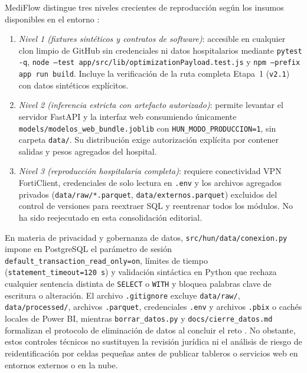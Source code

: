 MediFlow distingue tres niveles crecientes de reproducción según los insumos disponibles en el entorno \parencite{mediflow2026informe,mediflow2026auditoria}:

\begin{enumerate}[leftmargin=*,nosep]
\item \textit{Nivel 1 (fixtures sintéticos y contratos de software)}: accesible en cualquier clon limpio de GitHub sin credenciales ni datos hospitalarios mediante \texttt{pytest -q}, \texttt{node --test app/src/lib/optimizationPayload.test.js} y \texttt{npm --prefix app run build}. Incluye la verificación de la ruta completa Etapa~1 (\texttt{v2.1}) con datos sintéticos explícitos.
\item \textit{Nivel 2 (inferencia estricta con artefacto autorizado)}: permite levantar el servidor FastAPI y la interfaz web consumiendo únicamente \texttt{models/modelos\_web\_bundle.joblib} con \texttt{HUN\_MODO\_PRODUCCION=1}, sin carpeta \texttt{data/}. Su distribución exige autorización explícita por contener salidas y pesos agregados del hospital.
\item \textit{Nivel 3 (reproducción hospitalaria completa)}: requiere conectividad VPN FortiClient, credenciales de solo lectura en \texttt{.env} y los archivos agregados privados (\texttt{data/raw/*.parquet}, \texttt{data/externos.parquet}) excluidos del control de versiones para reextraer SQL y reentrenar todos los módulos. No ha sido reejecutado en esta consolidación editorial.
\end{enumerate}

En materia de privacidad y gobernanza de datos, \texttt{src/hun/data/conexion.py} impone en PostgreSQL el parámetro de sesión \texttt{default\_transaction\_read\_only=on}, límites de tiempo (\texttt{statement\_timeout=120\,s}) y validación sintáctica en Python que rechaza cualquier sentencia distinta de \texttt{SELECT} o \texttt{WITH} y bloquea palabras clave de escritura o alteración. El archivo \texttt{.gitignore} excluye \texttt{data/raw/}, \texttt{data/processed/}, archivos \texttt{.parquet}, credenciales \texttt{.env} y archivos \texttt{.pbix} o cachés locales de Power BI, mientras \texttt{borrar\_datos.py} y \texttt{docs/cierre\_datos.md} formalizan el protocolo de eliminación de datos al concluir el reto \parencite{mediflow2026auditoria}. No obstante, estos controles técnicos no sustituyen la revisión jurídica ni el análisis de riesgo de reidentificación por celdas pequeñas antes de publicar tableros o servicios web en entornos externos o en la nube.
